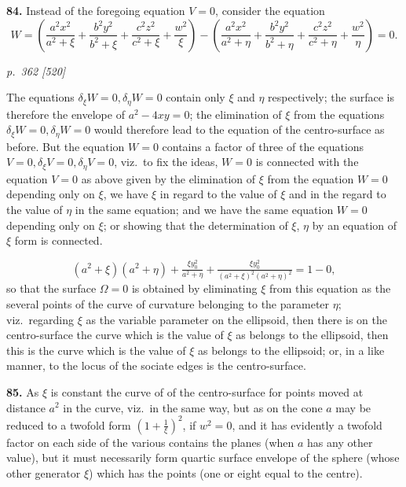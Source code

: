 \documentclass[11pt,a4paper]{article}
\theoremstyle{plain}
\theoremstyle{definition}
\begin{document}
\textbf{84.} Instead of the foregoing equation $V = 0$, consider the equation
\[
W = \left(\frac{a^2 x^2}{a^2 + \xi} + \frac{b^2 y^2}{b^2 + \xi} + \frac{c^2 z^2}{c^2 + \xi} + \frac{w^2}{\xi}\right) - \left(\frac{a^2 x^2}{a^2 + \eta} + \frac{b^2 y^2}{b^2 + \eta} + \frac{c^2 z^2}{c^2 + \eta} + \frac{w^2}{\eta}\right) = 0.
\]

\clearpage

\bigskip
\textit{p.~362 [520]}
\smallskip

The equations $\delta_\xi W = 0, \delta_\eta W = 0$ contain only $\xi$ and $\eta$ respectively; the surface is therefore the envelope of $a^2 - 4xy = 0$; the elimination of $\xi$ from the equations $\delta_\xi W = 0, \delta_\eta W = 0$ would therefore lead to the equation of the centro-surface as before. But the equation $W = 0$ contains a factor of three of the equations $V = 0, \delta_\xi V = 0, \delta_\eta V = 0$, viz.\ to fix the ideas, $W = 0$ is connected with the equation $V = 0$ as above given by the elimination of $\xi$ from the equation $W = 0$ depending only on $\xi$, we have $\xi$ in regard to the value of $\xi$ and in the regard to the value of $\eta$ in the same equation; and we have the same equation $W = 0$ depending only on $\xi$; or showing that the determination of $\xi$, $\eta$ by an equation of $\xi$ form is connected.

\[
(a^2 + \xi)(a^2 + \eta) + \tfrac{\xi y_0^2}{a^2 + \eta} + \tfrac{\xi y_0^2}{(a^2 + \xi)^2(a^2 + \eta)^2} = 1 - 0,
\]
so that the surface $\Omega = 0$ is obtained by eliminating $\xi$ from this equation as the several points of the curve of curvature belonging to the parameter $\eta$; viz.\ regarding $\xi$ as the variable parameter on the ellipsoid, then there is on the centro-surface the curve which is the value of $\xi$ as belongs to the ellipsoid, then this is the curve which is the value of $\xi$ as belongs to the ellipsoid; or, in a like manner, to the locus of the sociate edges is the centro-surface.

\textbf{85.} As $\xi$ is constant the curve of of the centro-surface for points moved at distance $a^2$ in the curve, viz.\ in the same way, but as on the cone $a$ may be reduced to a twofold form $\left(1 + \tfrac{1}{\xi}\right)^2$, if $w^2 = 0$, and it has evidently a twofold factor on each side of the various contains the planes (when $a$ has any other value), but it must necessarily form quartic surface envelope of the sphere (whose other generator $\xi$) which has the points (one or eight equal to the centre).
\end{document}
